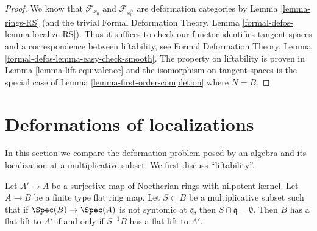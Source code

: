 \begin{proof}
We know that $\mathcal{F}_{x_0}$ and $\mathcal{F}_{x_0^\wedge}$
are deformation categories by Lemma \ref{lemma-rings-RS}
(and the trivial Formal Deformation Theory, Lemma
\ref{formal-defos-lemma-localize-RS}). Thus it suffices to check
our functor identifies tangent spaces and a correspondence
between liftability, see
Formal Deformation Theory, Lemma \ref{formal-defos-lemma-easy-check-smooth}.
The property on liftability is proven in
Lemma \ref{lemma-lift-equivalence}
and the isomorphism on tangent spaces is the special case of
Lemma \ref{lemma-first-order-completion} where $N = B$.
\end{proof}



\section{Deformations of localizations}
\label{section-compare-localization}

\noindent
In this section we compare the deformation problem posed
by an algebra and its localization at a multiplicative subset.
We first discuss ``liftability''.

\begin{lemma}
\label{lemma-lift-equivalence-localization}
Let $A' \to A$ be a surjective map of Noetherian rings with nilpotent kernel.
Let $A \to B$ be a finite type flat ring map.
Let $S \subset B$ be a multiplicative subset such that
if $\Spec(B) \to \Spec(A)$ is not syntomic at $\mathfrak q$,
then $S \cap \mathfrak q = \emptyset$.
Then $B$ has a flat lift to $A'$ if and only if
$S^{-1}B$ has a flat lift to $A'$.
\end{lemma}

